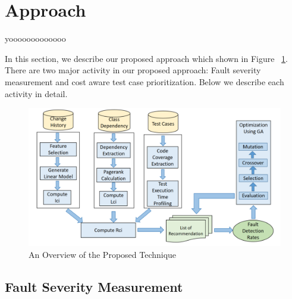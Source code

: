 \section{Approach}
\label{sec:method}

yooooooooooooo

In this section, we describe our proposed approach which shown in 
Figure ~\ref{fig:workflow}.
There are two major activity in our proposed approach: 
Fault severity measurement and cost aware test case prioritization. 
Below we describe each activity in detail. 

\begin{figure}[!hb]
	\centering
	\includegraphics[width=0.75\linewidth]{./workflow4.png}
	\vspace*{3pt}
	\caption{An Overview of the Proposed Technique}
	\label{fig:workflow}
\end{figure} 

\subsection{Fault Severity Measurement}




